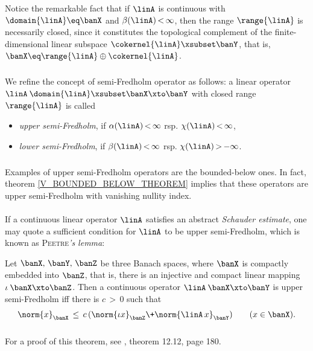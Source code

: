 \documentclass[11pt,twoside]{article}
\begin{document}
Notice the remarkable fact
that if $\linA$ is continuous with $\domain{\linA} \eq \banX$
and $\beta(\linA) {\,<\,} \infty$,
then the range $\range{\linA}$ is necessarily closed,
since it constitutes the topological complement
of the finite-dimensional linear subspace $\cokernel{\linA} \xsubset \banY$,
that is,
$\banX \eq \range{\linA} \oplus \cokernel{\linA}$.

\subparagraph{} %
We refine the concept of semi-Fredholm operator as follows:
a linear operator $\linA \: \domain{\linA} \xsubset \banX \xto \banY$
with closed range $\range{\linA}$ is called

\begin{itemize}[leftmargin=12mm]
\item[(F-3)]
\textit{upper semi-Fredholm},
if $\alpha(\linA) {\,<\,} \infty$ rsp. $\chi(\linA) {\,<\,} \infty$,

\item[(F-4)]
\textit{lower semi-Fredholm},
if $\beta(\linA) {\,<\,} \infty$ rsp. $\chi(\linA) {\,>\,} {-}\infty$.
\end{itemize}

\subparagraph{} %
Examples of upper semi-Fredholm operators are the bounded-below ones.
In fact,
theorem \ref{V_BOUNDED_BELOW_THEOREM} implies that
these operators are upper semi-Fredholm with vanishing nullity index.

\paragraph{} %
If a continuous linear operator $\linA$ satisfies
an abstract \textit{Schauder estimate},
one may quote a sufficient condition for $\linA$ to be upper semi-Fredholm,
which is known as \textsc{Peetre}\textit{'s lemma}:

\begin{theorem1}\label{V_PEETRE_THEOREM}
Let $\banX,\,\banY,\,\banZ$ be three Banach spaces,
where $\banX$ is compactly embedded into $\banZ$,
that is,
there is an injective and compact linear mapping $\iota \: \banX \xto \banZ$.
Then a continuous operator $\linA \: \banX \xto \banY$ is upper semi-Fredholm
iff there is $c {\,>\,} 0$ such that
\[
\norm{x}_{\banX} \, \leq \,
c \, (\norm{\iota x}_{\banZ} \+ \norm{\linA \,x}_{\banY})
\quad \quad (x \in \banX).
\]
\end{theorem1}

\subparagraph{}
For a proof of this theorem, see \cite{IV_Wl}, theorem 12.12, page 180.
\end{document}
